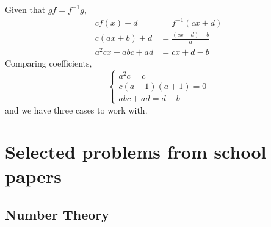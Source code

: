 \begin{solution}
Given that $gf=f^{-1}g$,
\begin{align*}
cf(x)+d&=f^{-1}(cx+d)\\
c(ax+b)+d&=\frac{(cx+d)-b}{a}\\
a^2cx+abc+ad&=cx+d-b
\end{align*}
Comparing coefficients,
\[ \begin{cases}
a^2c=c\\
c(a-1)(a+1)=0\\
abc+ad=d-b
\end{cases} \]
and we have three cases to work with.
\end{solution}
\pagebreak

\section{Selected problems from school papers}
\subsection{Number Theory}
